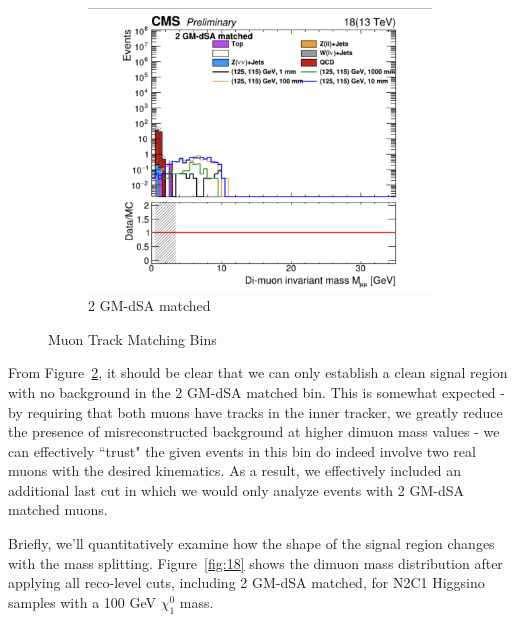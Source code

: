 \documentclass{article}
\begin{document}
\begin{figure}
\begin{subfigure}[b]{.3\textwidth}
  \centering
  \includegraphics[width=\textwidth]{Cut29.png}  
  \caption{2 GM-dSA matched}
  \label{fig:sub-fourth29}
\end{subfigure}
\caption{Muon Track Matching Bins}
\label{fig:17}
\end{figure}
\par
From Figure~\ref{fig:17}, it should be clear that we can only establish a clean signal region with no background in the 2 GM-dSA matched bin. This is somewhat expected - by requiring that both muons have tracks in the inner tracker, we greatly reduce the presence of misreconstructed background at higher dimuon mass values - we can effectively ``trust" the given events in this bin do indeed involve two real muons with the desired kinematics. As a result, we effectively included an additional last cut in which we would only analyze events with 2 GM-dSA matched muons.
\par
Briefly, we'll quantitatively examine how the shape of the signal region changes with the mass splitting. Figure~\ref{fig:18} shows the dimuon mass distribution after applying all reco-level cuts, including 2 GM-dSA matched, for N2C1 Higgsino samples with a 100 GeV $\chi_{1}^{0}$ mass. 
\par
\end{document}
